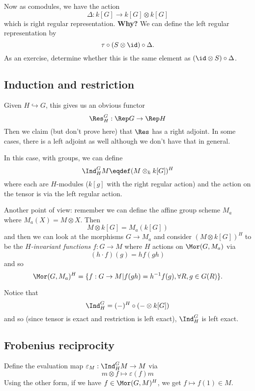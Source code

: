 \documentclass[12pt]{article}
\begin{document}
Now as comodules, we have the action 
\[\Delta:k[G]\to k[G]\otimes k[G]\]
which is right regular representation. \textbf{Why?} We can define the left regular representation by 
\[\tau\circ(S\otimes \id)\circ\Delta.\]
As an exercise, determine whether this is the same element as $(\id\otimes S)\circ \Delta$.

\subsection{Induction and restriction}
Given $H\hookrightarrow G$, this gives us an obvious functor 
\[\Res_H^G:\Rep G\to \Rep H\]
Then we claim (but don't prove here) that $\Res$ has a right adjoint. In some cases, there is a left adjoint as well although 
we don't have that in general.

In this case, with groups, we can define 
\[\Ind_H^G M\eqdef (M\otimes_kk[G])^H\]
where each are $H$-modules ($k[g]$ with the right regular action) and the action on the tensor is via the left regular action.

Another point of view: remember we can define the affine group scheme $M_a$ where $M_a(X)=M\otimes X$. Then 
\[M\otimes k[G]=M_a(k[G])\]
and then we can look at the morphisms $G\to M_a$ and consider 
$(M\otimes k[G])^H$ to be the \textit{$H$-invariant functions $f:G\to M$} where $H$ actions on $\Mor(G,M_a)$ via 
\[(h\cdot f)(g)=hf(gh)\]
and so 
\[\Mor(G,M_a)^H=\{f:G\to M|f(gh)=h^{-1}f(g),\forall R, g\in G(R)\}.\]

\begin{rmk}
	Notice that 
	\[\Ind_H^G=(-)^H\circ(-\otimes k[G])\]
	and so (since tensor is exact and restriction is left exact), $\Ind_H^G$ is left exact.
\end{rmk}

\subsection{Frobenius reciprocity}
Define the evaluation map $\varepsilon_M:\Ind_H^G M\to M$ via 
\[m\otimes f\mapsto \varepsilon(f)m\]
Using the other form, if we have $f\in\Mor(G,M)^H$, we get $f\mapsto f(1)\in M$.
\end{document}
